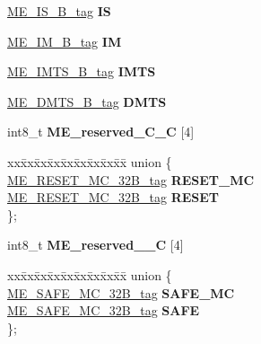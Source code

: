 \begin{DoxyCompactItemize}
\begin{tabbing}
\end{tabbing}\item 
\mbox{\label{structME__struct__tag_a704665f8338de2fda2b41ddccd02cb0c}} 
\mbox{\hyperlink{unionME__IS__32B__tag}{M\+E\+\_\+\+I\+S\+\_\+B\+\_\+tag}} {\bfseries IS}
\item 
\mbox{\label{structME__struct__tag_a8fb1b3aeed7d3f17e8c4f56737f43768}} 
\mbox{\hyperlink{unionME__IM__32B__tag}{M\+E\+\_\+\+I\+M\+\_\+B\+\_\+tag}} {\bfseries IM}
\item 
\mbox{\label{structME__struct__tag_aadb69691166d241dc254d8cfa5c24779}} 
\mbox{\hyperlink{unionME__IMTS__32B__tag}{M\+E\+\_\+\+I\+M\+T\+S\+\_\+B\+\_\+tag}} {\bfseries I\+M\+TS}
\item 
\mbox{\label{structME__struct__tag_aea4d1440dffc9d8d7e747a7bb4e6c34a}} 
\mbox{\hyperlink{unionME__DMTS__32B__tag}{M\+E\+\_\+\+D\+M\+T\+S\+\_\+B\+\_\+tag}} {\bfseries D\+M\+TS}
\item 
\mbox{\label{structME__struct__tag_af1dc94991e2ba89519e60d55476e89a8}} 
int8\+\_\+t {\bfseries M\+E\+\_\+reserved\+\_\+C\+\_\+C} \mbox{[}4\mbox{]}
\item 
\mbox{\label{structME__struct__tag_ad00b5efadeb78579b02d01cd46990bf6}} 
\begin{tabbing}
xx\=xx\=xx\=xx\=xx\=xx\=xx\=xx\=xx\=\kill
union \{\\
\>\mbox{\hyperlink{unionME__RESET__MC__32B__tag}{ME\_RESET\_MC\_32B\_tag}} {\bfseries RESET\_MC}\\
\>\mbox{\hyperlink{unionME__RESET__MC__32B__tag}{ME\_RESET\_MC\_32B\_tag}} {\bfseries RESET}\\
\}; \\

\end{tabbing}\item 
\mbox{\label{structME__struct__tag_a3b3560d77079c0cfde4ce8b5d29d7a22}} 
int8\+\_\+t {\bfseries M\+E\+\_\+reserved\+\_\+\_\+C} \mbox{[}4\mbox{]}
\item 
\mbox{\label{structME__struct__tag_aa3b0ffb6f257ebbfab698cc8dc4937ff}} 
\begin{tabbing}
xx\=xx\=xx\=xx\=xx\=xx\=xx\=xx\=xx\=\kill
union \{\\
\>\mbox{\hyperlink{unionME__SAFE__MC__32B__tag}{ME\_SAFE\_MC\_32B\_tag}} {\bfseries SAFE\_MC}\\
\>\mbox{\hyperlink{unionME__SAFE__MC__32B__tag}{ME\_SAFE\_MC\_32B\_tag}} {\bfseries SAFE}\\
\}; \\


\end{tabbing}
\end{DoxyCompactItemize}
